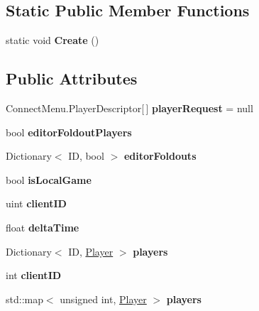 \subsection*{Static Public Member Functions}
\begin{DoxyCompactItemize}
\item 
\hypertarget{class_game_state_a2f3154927e33e16bd595b4aece996c61}{static void {\bfseries Create} ()}\label{class_game_state_a2f3154927e33e16bd595b4aece996c61}

\end{DoxyCompactItemize}
\subsection*{Public Attributes}
\begin{DoxyCompactItemize}
\item 
\hypertarget{class_game_state_a8b1949523ac8e40776c0617666023d64}{Connect\-Menu.\-Player\-Descriptor\mbox{[}$\,$\mbox{]} {\bfseries player\-Request} = null}\label{class_game_state_a8b1949523ac8e40776c0617666023d64}

\item 
\hypertarget{class_game_state_ad68ed3f1f32060bfff68d296e6750712}{bool {\bfseries editor\-Foldout\-Players}}\label{class_game_state_ad68ed3f1f32060bfff68d296e6750712}

\item 
\hypertarget{class_game_state_a47358e83d829da7a28c49f8d0a795125}{Dictionary$<$ I\-D, bool $>$ {\bfseries editor\-Foldouts}}\label{class_game_state_a47358e83d829da7a28c49f8d0a795125}

\item 
\hypertarget{class_game_state_aa4cba70bc38a13e80439dc784c6ca12e}{bool {\bfseries is\-Local\-Game}}\label{class_game_state_aa4cba70bc38a13e80439dc784c6ca12e}

\item 
\hypertarget{class_game_state_ad24a423ba6655fc6541b2f12ce98e0d0}{uint {\bfseries client\-I\-D}}\label{class_game_state_ad24a423ba6655fc6541b2f12ce98e0d0}

\item 
\hypertarget{class_game_state_a857eed8c97274c3dd9d3eb558a33f855}{float {\bfseries delta\-Time}}\label{class_game_state_a857eed8c97274c3dd9d3eb558a33f855}

\item 
\hypertarget{class_game_state_aed9c4cf83c497c6e36585e0ed3999564}{Dictionary$<$ I\-D, \hyperlink{struct_game_state_1_1_player}{Player} $>$ {\bfseries players}}\label{class_game_state_aed9c4cf83c497c6e36585e0ed3999564}

\item 
\hypertarget{class_game_state_adb8c9c7f10d683332cbd62927d35cb35}{int {\bfseries client\-I\-D}}\label{class_game_state_adb8c9c7f10d683332cbd62927d35cb35}

\item 
\hypertarget{class_game_state_a8f156a6cce5f2b9945c274b6bfc971ce}{std\-::map$<$ unsigned int, \hyperlink{struct_game_state_1_1_player}{Player} $>$ {\bfseries players}}\label{class_game_state_a8f156a6cce5f2b9945c274b6bfc971ce}

\end{DoxyCompactItemize}
